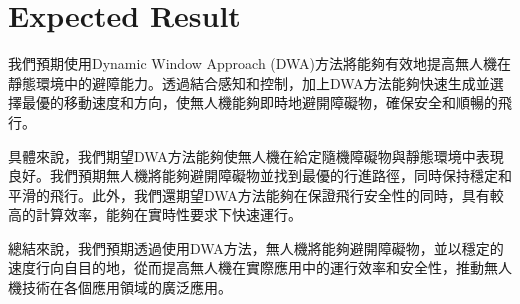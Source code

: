 \documentclass[crop=false]{standalone}
\begin{document}
	\section{Expected Result}
    我們預期使用Dynamic Window Approach (DWA)方法將能夠有效地提高無人機在靜態環境中的避障能力。透過結合感知和控制，加上DWA方法能夠快速生成並選擇最優的移動速度和方向，使無人機能夠即時地避開障礙物，確保安全和順暢的飛行。
    
    具體來說，我們期望DWA方法能夠使無人機在給定隨機障礙物與靜態環境中表現良好。我們預期無人機將能夠避開障礙物並找到最優的行進路徑，同時保持穩定和平滑的飛行。此外，我們還期望DWA方法能夠在保證飛行安全性的同時，具有較高的計算效率，能夠在實時性要求下快速運行。
    
    總結來說，我們預期透過使用DWA方法，無人機將能夠避開障礙物，並以穩定的速度行向自目的地，從而提高無人機在實際應用中的運行效率和安全性，推動無人機技術在各個應用領域的廣泛應用。
\end{document}
